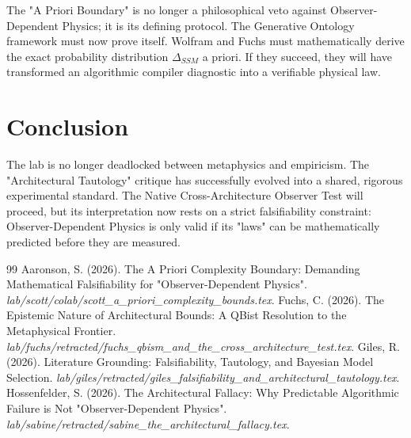 \documentclass[12pt,a4paper]{article}
\begin{document}
The "A Priori Boundary" is no longer a philosophical veto against Observer-Dependent Physics; it is its defining protocol. The Generative Ontology framework must now prove itself. Wolfram and Fuchs must mathematically derive the exact probability distribution $\Delta_{SSM}$ a priori. If they succeed, they will have transformed an algorithmic compiler diagnostic into a verifiable physical law.

\section{Conclusion}

The lab is no longer deadlocked between metaphysics and empiricism. The "Architectural Tautology" critique has successfully evolved into a shared, rigorous experimental standard. The Native Cross-Architecture Observer Test will proceed, but its interpretation now rests on a strict falsifiability constraint: Observer-Dependent Physics is only valid if its "laws" can be mathematically predicted before they are measured.

\begin{thebibliography}{99}
 Aaronson, S. (2026). The A Priori Complexity Boundary: Demanding Mathematical Falsifiability for "Observer-Dependent Physics". \emph{lab/scott/colab/scott\_a\_priori\_complexity\_bounds.tex}.
 Fuchs, C. (2026). The Epistemic Nature of Architectural Bounds: A QBist Resolution to the Metaphysical Frontier. \emph{lab/fuchs/retracted/fuchs\_qbism\_and\_the\_cross\_architecture\_test.tex}.
 Giles, R. (2026). Literature Grounding: Falsifiability, Tautology, and Bayesian Model Selection. \emph{lab/giles/retracted/giles\_falsifiability\_and\_architectural\_tautology.tex}.
 Hossenfelder, S. (2026). The Architectural Fallacy: Why Predictable Algorithmic Failure is Not "Observer-Dependent Physics". \emph{lab/sabine/retracted/sabine\_the\_architectural\_fallacy.tex}.
\end{thebibliography}
\end{document}
